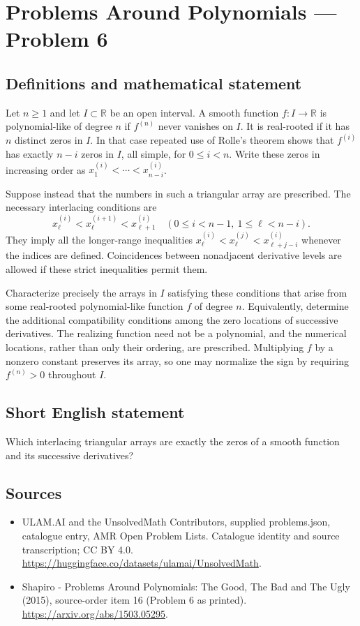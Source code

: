 \documentclass[11pt,a4paper]{article}
\begin{document}
\section*{Problems Around Polynomials — Problem 6}\label{statement}

\subsection{Definitions and mathematical statement}
Let $n\geq1$ and let $I\subset\mathbb R$ be an open interval.
A smooth function $f:I\to\mathbb R$ is polynomial-like of degree $n$
if $f^{(n)}$ never vanishes on $I$. It is real-rooted if it has
$n$ distinct zeros in $I$. In that case repeated use of Rolle's
theorem shows that $f^{(i)}$ has exactly $n-i$ zeros in $I$, all
simple, for $0\leq i<n$.
Write these zeros in increasing order as
$x^{(i)}_1<\cdots<x^{(i)}_{n-i}$.

Suppose instead that the numbers in such a triangular array are
prescribed. The necessary interlacing conditions are
\[
 x^{(i)}_\ell<x^{(i+1)}_\ell<x^{(i)}_{\ell+1}
 \quad(0\leq i<n-1,\ 1\leq\ell<n-i).
\]
They imply all the longer-range inequalities
$x^{(i)}_\ell<x^{(j)}_\ell<x^{(i)}_{\ell+j-i}$ whenever the indices
are defined. Coincidences between nonadjacent derivative levels are
allowed if these strict inequalities permit them.

Characterize precisely the arrays in $I$ satisfying these conditions
that arise from some real-rooted polynomial-like function $f$ of
degree $n$. Equivalently, determine the additional compatibility
conditions among the zero locations of successive derivatives.
The realizing function need not be a polynomial, and the numerical
locations, rather than only their ordering, are prescribed.
Multiplying $f$ by a nonzero constant preserves its array, so one
may normalize the sign by requiring $f^{(n)}>0$ throughout $I$.
\subsection{Short English statement}
Which interlacing triangular arrays are exactly the zeros of a smooth function and its successive derivatives?
\subsection{Sources}
\begin{itemize}
\item[S1] ULAM.AI and the UnsolvedMath Contributors, supplied problems.json, catalogue entry, AMR Open Problem Lists. Catalogue identity and source transcription; CC BY 4.0.
\url{https://huggingface.co/datasets/ulamai/UnsolvedMath}.
\item[S2] Shapiro - Problems Around Polynomials: The Good, The Bad and The Ugly (2015), source-order item 16 (Problem 6 as printed). 
\url{https://arxiv.org/abs/1503.05295}.
\end{itemize}
\end{document}

